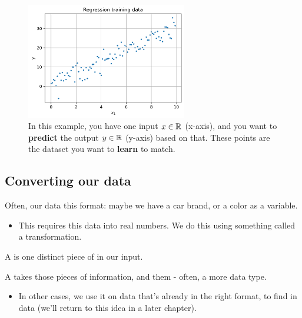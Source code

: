         \begin{figure}[H]
        \centering
            \includegraphics[width=70mm,scale=0.5]{images/regression_images/Regression_Training_Data.png}
        
            \caption*{In this example, you have one input $x \in \mathbb R$ (x-axis), and you want to \textbf{predict} the output $y \in \mathbb R$ (y-axis) based on that. These points are the dataset you want to \textbf{learn} to match.}
        \end{figure}



    \phantom{}
        
    \subsection{Converting our data}
    
        Often, our data  this format: maybe we have a car brand, or a color as a variable.

        \begin{itemize}
            \item This requires  this data into real numbers. We do this using something called a  transformation.\\
        \end{itemize}
        
        
        
        \begin{definition}
            A  is one distinct piece of  in our input.

            \phantom{}
            
            A  takes those pieces of information, and  them - often, a more  data type.

            \begin{itemize}
                \item In other cases, we use it on data that's already in the right format, to find  in data (we'll return to this idea in a later chapter).
            \end{itemize}
            
        \end{definition}
        
